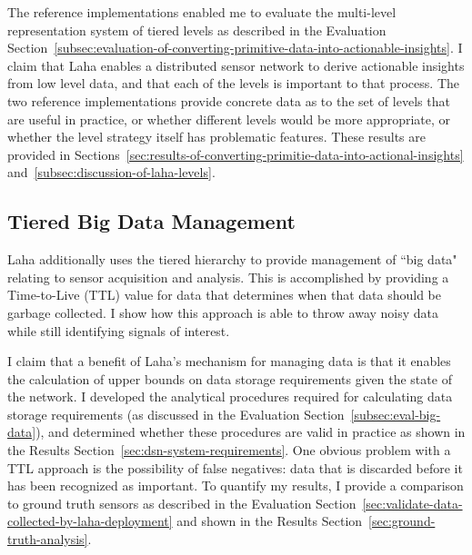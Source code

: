 The reference implementations enabled me to evaluate the multi-level representation system of tiered levels as described in the Evaluation Section~\ref{subsec:evaluation-of-converting-primitive-data-into-actionable-insights}. I claim that Laha enables a distributed sensor network to derive actionable insights from low level data, and that each of the levels is important to that process. The two reference implementations provide concrete data as to the set of levels that are useful in practice, or whether different levels would be more appropriate, or whether the level strategy itself has problematic features. These results are provided in Sections~\ref{sec:results-of-converting-primitie-data-into-actional-insights} and~\ref{subsec:discussion-of-laha-levels}.

\subsection{Tiered Big Data Management}\label{subsec:tiered-big-data-management}
Laha additionally uses the tiered hierarchy to provide management of ``big data" relating to sensor acquisition and analysis. This is accomplished by providing a Time-to-Live (TTL) value for data that determines when that data should be garbage collected. I show how this approach is able to throw away noisy data while still identifying signals of interest.

I claim that a benefit of Laha's mechanism for managing data is that it enables the calculation of upper bounds on data storage requirements given the state of the network. I developed the analytical procedures required for calculating data storage requirements (as discussed in the Evaluation Section~\ref{subsec:eval-big-data}), and determined whether these procedures are valid in practice as shown in the Results Section~\ref{sec:dsn-system-requirements}. One obvious problem with a TTL approach is the possibility of false negatives: data that is discarded before it has been recognized as important. To quantify my results, I provide a comparison to ground truth sensors as described in the Evaluation Section~\ref{sec:validate-data-collected-by-laha-deployment} and shown in the Results Section~\ref{sec:ground-truth-analysis}.

